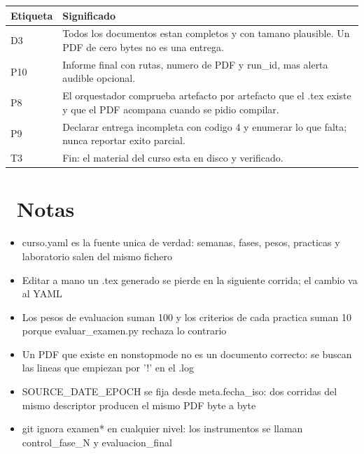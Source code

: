 \documentclass[11pt,a4paper]{article}
\newcommand{\iconotexto}[2]{\textcolor{cyanNeon}{\faIcon{#1}}~#2}
\begin{document}
\vspace{6pt}
\begin{tcolorbox}[cajaContenido, title={\faIcon{table}~Leyenda de etiquetas}]
\small
\begin{tabularx}{\linewidth}{@{}>{\centering\arraybackslash}p{1.4cm}X@{}}
\toprule
\textbf{Etiqueta} & \textbf{Significado} \\ \midrule
D3 & Todos los documentos estan completos y con tamano plausible. Un PDF de cero bytes no es una entrega. \\
P10 & Informe final con rutas, numero de PDF y run\_id, mas alerta audible opcional. \\
P8 & El orquestador comprueba artefacto por artefacto que el .tex existe y que el PDF acompana cuando se pidio compilar. \\
P9 & Declarar entrega incompleta con codigo 4 y enumerar lo que falta; nunca reportar exito parcial. \\
T3 & Fin: el material del curso esta en disco y verificado. \\
\bottomrule
\end{tabularx}
\end{tcolorbox}


\section{\iconotexto{sticky-note}{Notas}}
\begin{itemize}
\item curso.yaml es la fuente unica de verdad: semanas, fases, pesos, practicas y laboratorio salen del mismo fichero
\item Editar a mano un .tex generado se pierde en la siguiente corrida; el cambio va al YAML
\item Los pesos de evaluacion suman 100 y los criterios de cada practica suman 10 porque evaluar\_examen.py rechaza lo contrario
\item Un PDF que existe en nonstopmode no es un documento correcto: se buscan las lineas que empiezan por '!' en el .log
\item SOURCE\_DATE\_EPOCH se fija desde meta.fecha\_iso: dos corridas del mismo descriptor producen el mismo PDF byte a byte
\item git ignora examen* en cualquier nivel: los instrumentos se llaman control\_fase\_N y evaluacion\_final
\end{itemize}

\end{document}
